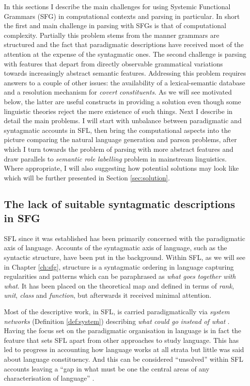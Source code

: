 In this sections I describe the main challenges for using Systemic Functional Grammars (SFG) in computational contexts and parsing in particular. In short the first and main challenge in parsing with SFGs is that of computational complexity. Partially this problem stems from the manner grammars are structured and the fact that paradigmatic descriptions have received most of the attention at the expense of the syntagmatic ones. The second challenge is parsing with features that depart from directly observable grammatical variations towards increasingly abstract semantic features. Addressing this problem requires answers to a couple of other issues: the availability of a lexical-semantic database and a resolution mechanism for \textit{covert constituents}. As we will see motivated below, the latter are useful constructs in providing a solution even though some linguistic theories reject the mere existence of such things. Next I describe in detail the main problems. I will start with unbalance between paradigmatic and syntagmatic accounts in SFL, then bring the computational aspects into the picture comparing the natural language generation and parson problems, after which I turn towards the problem of parsing with more abstract features and draw parallels to \textit{semantic role labelling} problem in mainstream linguistics. Where appropriate, I will also suggesting how potential solutions may look like which will be further presented in Section \ref{sec:solution}.

\subsection{The lack of suitable syntagmatic descriptions in SFG}

SFL since it was established has been primarily concerned with the paradigmatic axis of language. Accounts of the syntagmatic axis of language, such as the syntactic structure, have been put in the background. Within SFL, as we will see in Chapter \ref{ch:sfg}, structure is a syntagmatic ordering in language capturing regularities and patterns which can be paraphrased as \textit{what goes together with what}. It has been placed on the theoretical map and defined in terms of \textit{rank}, \textit{unit}, \textit{class} and \textit{function}, but afterwards it received minimal attention.

Most of the descriptive work, in SFL, is carried paradigmatically via \textit{system networks} (Definition \ref{def:system}) describing \textit{what could go instead of what} \citep[22]{Halliday2013}. Having the focus set on the paradigmatic organisation in language is in fact the feature that sets SFL apart from other approaches to study language.
This has led to progress in accounting how language works at all strata but little was said about language constituency. And this can be considered ``unsolved'' within SFL accounts leaving a ``gap in what must be one the central areas of any characterisation of language'' \citep[25]{Bateman2008}. 


